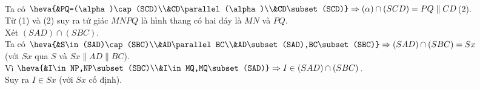 \begin{ex}
{\begin{itemchoice}
			\\
			Ta có $\heva{&PQ=(\alpha)\cap (SCD)\\&CD\parallel (\alpha)\\&CD\subset (SCD)}\Rightarrow (\alpha)\cap (SCD)=PQ\parallel CD$\quad  (2).\\
			Từ (1) và (2) suy ra tứ giác $MNPQ$ là hình thang có hai đáy là $MN$ và $PQ$. 
			\\
			Xét $(SAD)\cap (SBC)$.\\ 
			Ta có $\heva{&S\in (SAD)\cap (SBC)\\&AD\parallel BC\\&AD\subset (SAD),BC\subset (SBC)}\Rightarrow (SAD)\cap (SBC)=Sx$\\ (với  $Sx$ qua $S$ và $Sx\parallel AD\parallel BC$).\\
			Vì $\heva{&I\in NP,NP\subset (SBC)\\&I\in MQ,MQ\subset (SAD)}\Rightarrow I\in (SAD)\cap  (SBC)$.\\
			Suy ra  $I\in Sx$ (với $Sx$ cố định).
		\end{itemchoice}
	} 
\end{ex}

